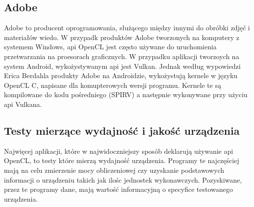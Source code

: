 \subsection[Adobe]{Adobe}
Adobe to producent oprogramowania, służącego między innymi do obróbki zdjęć i materiałów wiedo. W przypadk produktów Adobe tworzonych na komputery z systemem Windows, api OpenCL jest często używane do uruchomienia przetwarzania na proesorach graficznych. W przypadku aplikacji tworzoych na system Android, wykożystywanym api jest Vulkan. Jednak według wypowiedzi Erica Berdahla \cite{IWOCL} produkty Adobe na Androidzie, wykożystują kernele w języku OpenCL C, napisane dla komupterowych wersji programu. Kernele te są kompilowane do kodu pośredniego (SPIRV) a następnie wykonywane przy użyciu api Vulkana.
\subsection[Testy mierzące wydajność i jakość urządzenia]{Testy mierzące wydajność i jakość urządzenia}
Najwięcej aplikacji, które w najwidoczniejszy sposób deklarują używanie api OpenCL, to testy które mierzą wydajność urządzenia. Programy te najczęściej mają na celu zmierzenie mocy obliczeniowej czy uzyskanie podstawowych informacji o urządzeniu takich jak ilośc jednostek wykonawczych. Pozyskiwane, przez te programy dane, mają wartość informacyjną o specyfice testowanego urządzenia.

